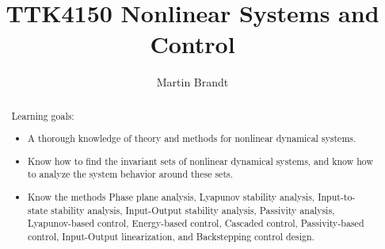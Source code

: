 \documentclass[num-refs]{wiley-networks}
\title{TTK4150 Nonlinear Systems and Control}
\author[1\authfn{1}]{Martin Brandt}
\begin{document}
\renewcommand{\labelitemi}{$*$}

\maketitle

\begin{abstract}
Learning goals:
\begin{itemize}
\item A thorough knowledge of theory and methods for nonlinear dynamical systems.
\item Know how to find the invariant sets of nonlinear dynamical systems, and know how to analyze the system behavior around these sets.
\item Know the methods Phase plane analysis, Lyapunov stability analysis, Input-to-state stability analysis, Input-Output stability analysis, Passivity analysis, Lyapunov-based control, Energy-based control, Cascaded control, Passivity-based control, Input-Output linearization, and Backstepping control design.
\end{itemize}
\end{abstract}
\setlength{\parindent}{0pt}
\newpage

\tableofcontents

\newpage






%
%
\end{document}
